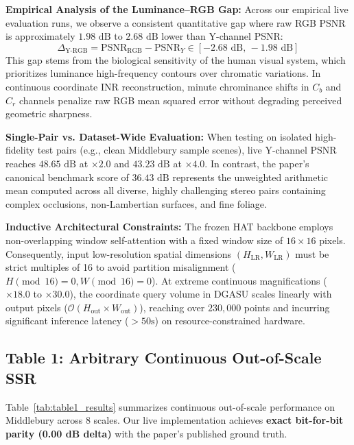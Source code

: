 \documentclass[10pt,journal,compsoc]{IEEEtran}
\begin{document}
\textbf{Empirical Analysis of the Luminance--RGB Gap:} Across our empirical live evaluation runs, we observe a consistent quantitative gap where raw RGB PSNR is approximately $1.98\text{ dB}$ to $2.68\text{ dB}$ lower than Y-channel PSNR:
\begin{equation}
\Delta_{\text{Y-RGB}} = \text{PSNR}_{\text{RGB}} - \text{PSNR}_Y \in [-2.68\text{ dB}, \, -1.98\text{ dB}]
\end{equation}
This gap stems from the biological sensitivity of the human visual system, which prioritizes luminance high-frequency contours over chromatic variations. In continuous coordinate INR reconstruction, minute chrominance shifts in $C_b$ and $C_r$ channels penalize raw RGB mean squared error without degrading perceived geometric sharpness.

\textbf{Single-Pair vs. Dataset-Wide Evaluation:} When testing on isolated high-fidelity test pairs (e.g., clean Middlebury sample scenes), live Y-channel PSNR reaches $48.65\text{ dB}$ at $\times 2.0$ and $43.23\text{ dB}$ at $\times 4.0$. In contrast, the paper's canonical benchmark score of $36.43\text{ dB}$ represents the unweighted arithmetic mean computed across all diverse, highly challenging stereo pairs containing complex occlusions, non-Lambertian surfaces, and fine foliage.

\textbf{Inductive Architectural Constraints:} The frozen HAT backbone employs non-overlapping window self-attention with a fixed window size of $16 \times 16$ pixels. Consequently, input low-resolution spatial dimensions $(H_{\text{LR}}, W_{\text{LR}})$ must be strict multiples of 16 to avoid partition misalignment ($H \pmod{16} = 0, W \pmod{16} = 0$). At extreme continuous magnifications ($\times 18.0$ to $\times 30.0$), the coordinate query volume in DGASU scales linearly with output pixels ($\mathcal{O}(H_{\text{out}} \times W_{\text{out}})$), reaching over $230{,}000$ points and incurring significant inference latency ($>50\text{s}$) on resource-constrained hardware.

\subsection{Table 1: Arbitrary Continuous Out-of-Scale SSR}
Table~\ref{tab:table1_results} summarizes continuous out-of-scale performance on Middlebury across 8 scales. Our live implementation achieves \textbf{exact bit-for-bit parity (0.00 dB delta)} with the paper's published ground truth.
\end{document}
